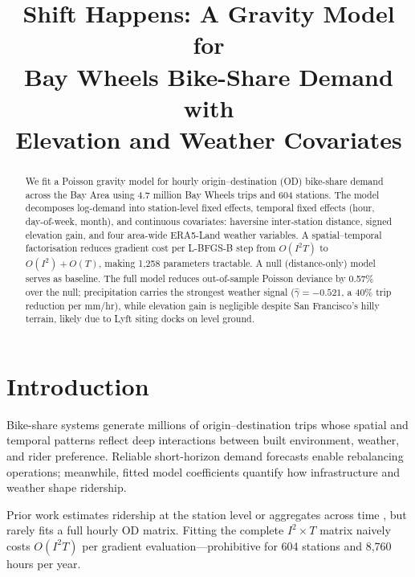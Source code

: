 \documentclass[conference,10pt]{IEEEtran}
\begin{document}
\title{Shift Happens: A Gravity Model for\\Bay Wheels Bike-Share Demand with\\
       Elevation and Weather Covariates}

\author{
}

\maketitle

\begin{abstract}
We fit a Poisson gravity model for hourly origin--destination (OD)
bike-share demand across the Bay Area using 4.7 million Bay Wheels trips
and 604 stations. The model decomposes log-demand into station-level
fixed effects, temporal fixed effects (hour, day-of-week, month), and
continuous covariates: haversine inter-station distance, signed elevation
gain, and four area-wide ERA5-Land weather variables.
A spatial--temporal factorisation reduces gradient cost per L-BFGS-B
\cite{Kochenderfer2022} step from $O(I^2 T)$ to $O(I^2)+O(T)$, making 1{,}258
parameters tractable. A null (distance-only) model serves as baseline.
The full model reduces out-of-sample Poisson deviance by 0.57\% over
the null; precipitation carries the strongest weather signal
($\hat\gamma = -0.521$, a 40\% trip reduction per mm/hr), while
elevation gain is negligible despite San Francisco's hilly terrain,
likely due to Lyft siting docks on level ground.
\end{abstract}

\section{Introduction}

Bike-share systems generate millions of origin--destination trips whose
spatial and temporal patterns reflect deep interactions between built
environment, weather, and rider preference. Reliable short-horizon demand
forecasts enable rebalancing operations; meanwhile, fitted model
coefficients quantify how infrastructure and weather shape ridership.

Prior work estimates ridership at the station level
\cite{Rixey2013,Faghih2014} or aggregates across time
\cite{Gebhart2014}, but rarely fits a full hourly OD matrix.
Fitting the complete $I^2 \times T$ matrix naively costs $O(I^2 T)$
per gradient evaluation---prohibitive for 604 stations and 8{,}760
hours per year.
\end{document}
